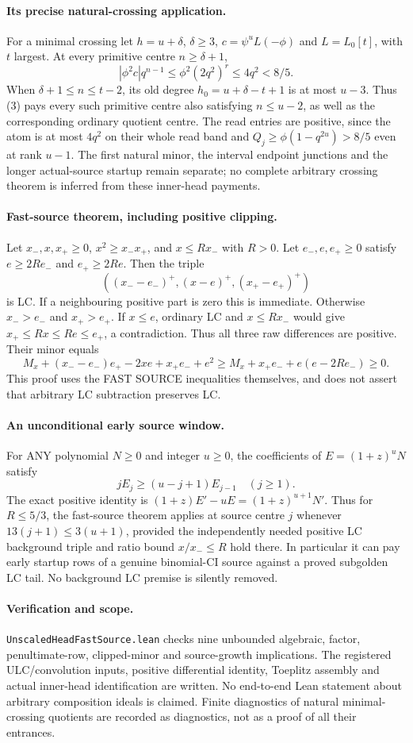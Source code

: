 \paragraph{Its precise natural-crossing application.}
For a minimal crossing let $h=u+\delta$, $\delta\ge3$,
$c=\psi^uL(-\phi)$ and $L=L_0[t]$, with $t$ largest.
At every primitive centre $n\ge\delta+1$,
\[
 |\phi^2c|q^{n-1}\le\phi^2(2q^2)^r\le4q^2<8/5.
\]
When $\delta+1\le n\le t-2$, its old degree
$h_0=u+\delta-t+1$ is at most $u-3$. Thus (3) pays every
such primitive centre also satisfying $n\le u-2$, as well as
the corresponding ordinary quotient centre. The read entries are
positive, since the atom is at most $4q^2$ on their whole read band
and $Q_j\ge\phi(1-q^{2u})>8/5$ even at rank $u-1$.
The first natural minor, the interval endpoint junctions and the
longer actual-source startup remain separate; no complete arbitrary
crossing theorem is inferred from these inner-head payments.

\paragraph{Fast-source theorem, including positive clipping.}
Let $x_-,x,x_+\ge0$, $x^2\ge x_-x_+$, and
$x\le R x_-$ with $R>0$. Let $e_-,e,e_+\ge0$ satisfy
$e\ge2R e_-$ and $e_+\ge2R e$. Then the triple
\[
 ((x_--e_-)^+,(x-e)^+,(x_+-e_+)^+)
\]
is LC. If a neighbouring positive part is zero this is immediate.
Otherwise $x_->e_-$ and $x_+>e_+$. If $x\le e$, ordinary LC
and $x\le R x_-$ would give $x_+\le R x\le R e\le e_+$,
a contradiction. Thus all three raw differences are positive.
Their minor equals
\[
 M_x+(x_--e_-)e_+-2xe+x_+e_-+e^2
 \ge M_x+x_+e_-+e(e-2R e_-)\ge0.
\]
This proof uses the FAST SOURCE inequalities themselves, and does
not assert that arbitrary LC subtraction preserves LC.

\paragraph{An unconditional early source window.}
For ANY polynomial $N\ge0$ and integer $u\ge0$, the coefficients
of $E=(1+z)^uN$ satisfy
\[
 jE_j\ge(u-j+1)E_{j-1}\quad(j\ge1).
\]
The exact positive identity is
$(1+z)E'-uE=(1+z)^{u+1}N'$. Thus for $R\le5/3$,
the fast-source theorem applies at source centre $j$ whenever
$13(j+1)\le3(u+1)$, provided the independently needed positive
LC background triple and ratio bound $x/x_-\le R$ hold there.
In particular it can pay early startup rows of a genuine binomial-CI
source against a proved subgolden LC tail. No background LC premise
is silently removed.

\paragraph{Verification and scope.}
\texttt{UnscaledHeadFastSource.lean} checks nine unbounded algebraic,
factor, penultimate-row, clipped-minor and source-growth implications.
The registered ULC/convolution inputs, positive differential identity,
Toeplitz assembly and actual inner-head identification are written.
No end-to-end Lean statement about arbitrary composition ideals is
claimed. Finite diagnostics of natural minimal-crossing quotients
are recorded as diagnostics, not as a proof of all their entrances.
